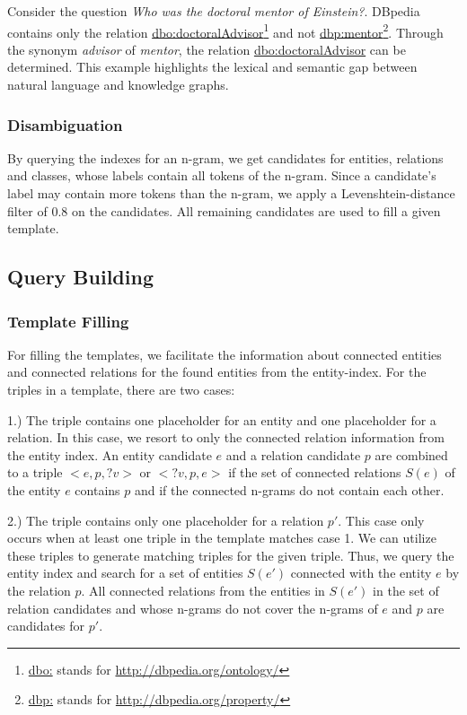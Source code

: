 \documentclass{IOS-Book-Article}
\begin{document}
Consider the question \textit{Who was the doctoral mentor of Einstein?}. DBpedia contains only the relation \url{dbo:doctoralAdvisor}\footnote{\url{dbo:} stands for \url{http://dbpedia.org/ontology/}} and not \url{dbp:mentor}\footnote{\url{dbp:} stands for \url{http://dbpedia.org/property/}}. 
Through the synonym \textit{advisor} of \textit{mentor}, the relation \url{dbo:doctoralAdvisor} can be determined.
This example highlights the lexical and semantic gap between natural language and knowledge graphs. 

\subsubsection{Disambiguation}
By querying the indexes for an n-gram, we get candidates for entities, relations and classes, whose labels contain all tokens of the n-gram.
Since a candidate's label may contain more tokens than the n-gram, we apply a Levenshtein-distance filter of 0.8 on the candidates.
All remaining candidates are used to fill a given template.

\subsection{Query Building}
\label{query_building}
\subsubsection{Template Filling}
For filling the templates, we facilitate the information about connected entities and connected relations for the found entities from the entity-index. 
For the triples in a template, there are two cases:

1.) The triple contains one placeholder for an entity and one placeholder for a relation.
In this case, we resort to only the connected relation information from the entity index.
An entity candidate $e$ and a relation candidate $p$ are combined to a triple $<e,p,?v>$ or $<?v,p,e>$ if the set of connected relations $S(e)$ of the entity $e$ contains $p$ and if the connected n-grams do not contain each other.

2.) The triple contains only one placeholder for a relation $p'$. This case only occurs when at least one triple in the template matches case 1. We can utilize these triples to generate matching triples for the given triple.
Thus, we query the entity index and search for a set of entities $S(e')$ connected with the entity $e$ by the relation $p$. 
All connected relations from the entities in $S(e')$ in the set of relation candidates and whose n-grams do not cover the n-grams of $e$ and $p$ are candidates for $p'$.
\end{document}
